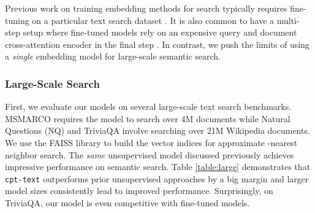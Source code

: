 \documentclass[nohyperref]{article}
\begin{document}
Previous work on training embedding methods for search typically requires fine-tuning on a particular text search dataset \cite{dpr, e2e, Qu}. It is also common to have a multi-step setup where fine-tuned models rely on an expensive query and document cross-attention encoder in the final step \cite{Qu, mini}. In contrast, we push the limits of using a \textit{single} embedding model for large-scale semantic search.


\subsubsection{Large-Scale Search}
\label{sec:large}

First, we evaluate our models on several large-scale text search benchmarks. MSMARCO \cite{msmarco} requires the model to search over 4M documents while Natural Questions (NQ) \cite{nq} and TriviaQA \cite{trivia} involve searching over 21M Wikipedia documents. We use the FAISS library \cite{Johnson} to build the vector indices for approximate -nearest neighbor search. The \textit{same} unsupervised model discussed previously achieves impressive performance on semantic search. Table \ref{table:large} demonstrates that \texttt{cpt-text} outperforms prior unsupervised approaches by a big margin and larger model sizes consistently lead to improved performance. Surprisingly, on TriviaQA, our model is even competitive with fine-tuned models.
\end{document}
